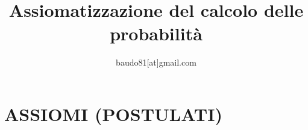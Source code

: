 \documentclass[a4paper,10pt]{article}
\title{Assiomatizzazione del calcolo delle probabilità}
\author{baudo81[at]gmail.com}
\begin{document}
\maketitle



\section{ASSIOMI (POSTULATI)\cite{assiomiprob}}


 

\end{document}
